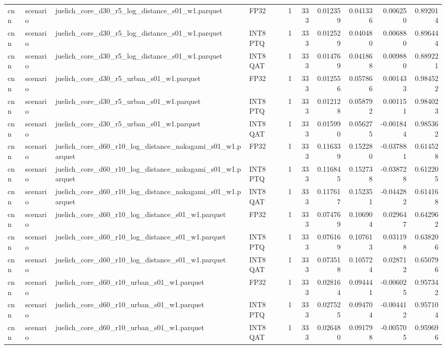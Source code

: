 \begin{tabular}{llllrrrrrr}
cnn & scenario & juelich\_core\_d30\_r5\_log\_distance\_s01\_w1.parquet & FP32 & 1 & 333 & 0.012359 & 0.041336 & 0.006250 & 0.892014 \\
cnn & scenario & juelich\_core\_d30\_r5\_log\_distance\_s01\_w1.parquet & INT8 PTQ & 1 & 333 & 0.012529 & 0.040480 & 0.006880 & 0.896444 \\
cnn & scenario & juelich\_core\_d30\_r5\_log\_distance\_s01\_w1.parquet & INT8 QAT & 1 & 333 & 0.014769 & 0.041868 & 0.009880 & 0.889221 \\
cnn & scenario & juelich\_core\_d30\_r5\_urban\_s01\_w1.parquet & FP32 & 1 & 333 & 0.012556 & 0.057866 & 0.001433 & 0.984522 \\
cnn & scenario & juelich\_core\_d30\_r5\_urban\_s01\_w1.parquet & INT8 PTQ & 1 & 333 & 0.012128 & 0.058792 & 0.001151 & 0.984023 \\
cnn & scenario & juelich\_core\_d30\_r5\_urban\_s01\_w1.parquet & INT8 QAT & 1 & 333 & 0.015990 & 0.056275 & -0.001844 & 0.985362 \\
cnn & scenario & juelich\_core\_d60\_r10\_log\_distance\_nakagami\_s01\_w1.parquet & FP32 & 1 & 333 & 0.116339 & 0.152280 & -0.037881 & 0.614528 \\
cnn & scenario & juelich\_core\_d60\_r10\_log\_distance\_nakagami\_s01\_w1.parquet & INT8 PTQ & 1 & 333 & 0.116845 & 0.152738 & -0.038728 & 0.612205 \\
cnn & scenario & juelich\_core\_d60\_r10\_log\_distance\_nakagami\_s01\_w1.parquet & INT8 QAT & 1 & 333 & 0.117617 & 0.152351 & -0.044282 & 0.614168 \\
cnn & scenario & juelich\_core\_d60\_r10\_log\_distance\_s01\_w1.parquet & FP32 & 1 & 333 & 0.074769 & 0.106904 & 0.029647 & 0.642962 \\
cnn & scenario & juelich\_core\_d60\_r10\_log\_distance\_s01\_w1.parquet & INT8 PTQ & 1 & 333 & 0.076169 & 0.107613 & 0.031198 & 0.638206 \\
cnn & scenario & juelich\_core\_d60\_r10\_log\_distance\_s01\_w1.parquet & INT8 QAT & 1 & 333 & 0.073518 & 0.105724 & 0.028712 & 0.650796 \\
cnn & scenario & juelich\_core\_d60\_r10\_urban\_s01\_w1.parquet & FP32 & 1 & 333 & 0.028164 & 0.094441 & -0.006025 & 0.957342 \\
cnn & scenario & juelich\_core\_d60\_r10\_urban\_s01\_w1.parquet & INT8 PTQ & 1 & 333 & 0.027525 & 0.094704 & -0.004412 & 0.957104 \\
cnn & scenario & juelich\_core\_d60\_r10\_urban\_s01\_w1.parquet & INT8 QAT & 1 & 333 & 0.026480 & 0.091798 & -0.005705 & 0.959696 \\

\end{tabular}

